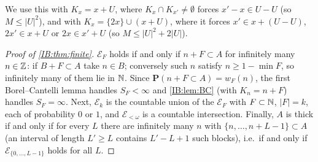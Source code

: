 We use this with $K_x=x+U$, where $K_x\cap K_{x'}\ne\emptyset$ forces $x'-x\in U-U$ (so
$M\le|U|^2$), and with $K_x=\{2x\}\cup(x+U)$, where it forces $x'\in x+(U-U)$,
$2x'\in x+U$ or $2x\in x'+U$ (so $M\le|U|^2+2|U|$).

\begin{proof}[Proof of \cref{IB:thm:finite}]
$\mathcal E_F$ holds if and only if $n+F\subset A$ for infinitely many $n\in\mathbb{Z}$: if $B+F\subset A$
take $n\in B$; conversely such $n$ satisfy $n\ge1-\min F$, so infinitely many of them
lie in $\mathbb{N}$. Since $\mathbf P(n+F\subset A)=w_F(n)$, the first Borel--Cantelli lemma handles
$S_F<\infty$ and \cref{IB:lem:BC} (with $K_n=n+F$) handles $S_F=\infty$. Next,
$\mathcal E_k$ is the countable union of the $\mathcal E_F$ with $F\subset\mathbb{N}$, $|F|=k$, each of
probability $0$ or $1$, and $\mathcal E_{<\omega}$ is a countable intersection. Finally, $A$ is
thick if and only if for every $L$ there are infinitely many $n$ with
$\{n,\dots,n+L-1\}\subset A$ (an interval of length $L'\ge L$ contains $L'-L+1$ such
blocks), i.e.\ if and only if $\mathcal E_{\{0,\dots,L-1\}}$ holds for all $L$.
\end{proof}

